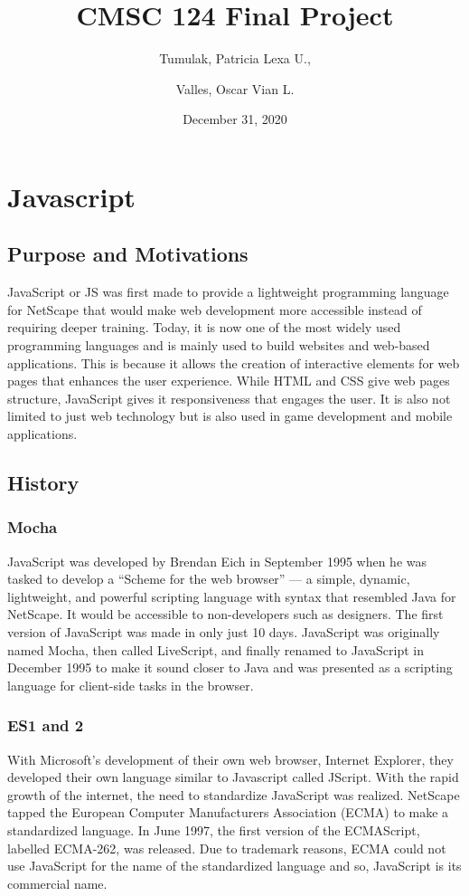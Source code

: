\documentclass{article}
\title{CMSC 124 Final Project}
\date{December 31, 2020}
\author{Tumulak, Patricia Lexa U., \\\and{} Valles, Oscar Vian L.}
\begin{document}
\maketitle
\newpage
\tableofcontents
\newpage
{}

\section{Javascript}
\subsection{Purpose and Motivations}
JavaScript or JS was first made to provide a lightweight programming language
for NetScape that would make web development more accessible instead of
requiring deeper training. Today, it is now one of the most widely used
programming languages and is mainly used to build websites and web-based
applications. This is because it allows the creation of interactive elements for
web pages that enhances the user experience. While HTML and CSS give web pages
structure, JavaScript gives it responsiveness that engages the user. It is also
not limited to just web technology but is also used in game development and
mobile applications.

\subsection{History}

  \subsubsection{Mocha}
  JavaScript was developed by Brendan Eich in September 1995 when he was tasked
  to develop a “Scheme for the web browser” --- a simple, dynamic, lightweight,
  and powerful scripting language with syntax that resembled Java for NetScape.
  It would be accessible to non-developers such as designers. The first version
  of JavaScript was made in only just 10 days. JavaScript was originally named
  Mocha, then called LiveScript, and finally renamed to JavaScript in December
  1995 to make it sound closer to Java and was presented as a scripting language
  for client-side tasks in the browser.

  \subsubsection{ES1 and 2}
  With Microsoft’s development of their own web browser, Internet Explorer, they
  developed their own language similar to Javascript called JScript. With the
  rapid growth of the internet, the need to standardize JavaScript was realized.
  NetScape tapped the European Computer Manufacturers Association (ECMA) to make
  a standardized language. In June 1997, the first version of the ECMAScript,
  labelled ECMA-262, was released. Due to trademark reasons, ECMA could not use
  JavaScript for the name of the standardized language and so, JavaScript is its
  commercial name.
\end{document}

